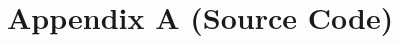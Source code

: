 \documentclass[main]{subfiles}
\begin{document}
\chapter*{\centering Appendix A (Source Code)}
\end{document}
